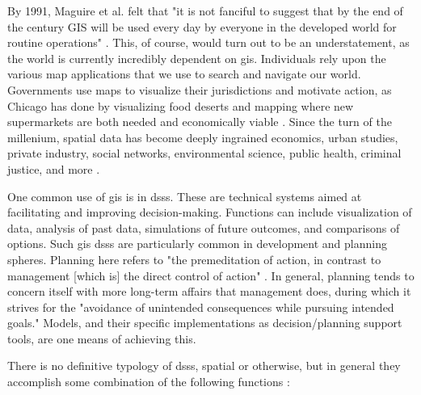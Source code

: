 \documentclass[notitlepage]{article}
\begin{document}
By 1991, Maguire et al. felt that "it is not fanciful to suggest that by the end of the century GIS will be used every day by everyone in the developed world for routine operations" \cite{maguireGeographicalInformationSystems1991}. This, of course, would turn out to be an understatement, as the world is currently incredibly dependent on \ac{gis}. Individuals rely upon the various map applications that we use to search and navigate our world. Governments use maps to visualize their jurisdictions and motivate action, as Chicago has done by visualizing food deserts and mapping where new supermarkets are both needed and economically viable \cite{goldsmithResponsiveCityEngaging2014}. Since the turn of the millenium, spatial data has become deeply ingrained economics, urban studies, private industry, social networks, environmental science, public health, criminal justice, and more \cite{goodchildSpatiallyIntegratedSocial2000}.

One common use of \ac{gis} is in \acp{dss}. These are technical systems aimed at facilitating and improving decision-making. Functions can include visualization of data, analysis of past data, simulations of future outcomes, and comparisons of options. Such \ac{gis} \acp{dss} are particularly common in development and planning spheres. Planning here refers to "the premeditation of action, in contrast to management [which is] the direct control of action" \cite{harrisLocationalModelsGeographic1993}. In general, planning tends to concern itself with more long-term affairs that management does, during which it strives for the "avoidance of unintended consequences while pursuing intended goals." Models, and their specific implementations as decision/planning support tools, are one means of achieving this. 

There is no definitive typology of \acp{dss}, spatial or otherwise, but in general they accomplish some combination of the following functions \cite{jankowskiGISGroupDecision2001}: 
\end{document}
